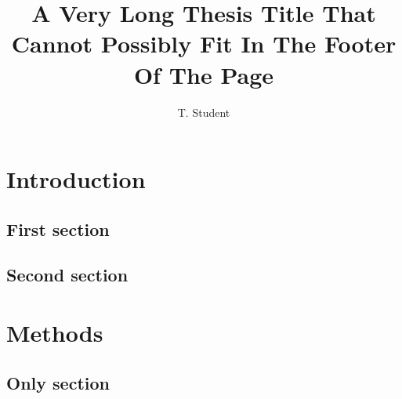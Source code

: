 \documentclass[phd,12pt,a4paper]{bangorthesis}
\title{A Very Long Thesis Title That Cannot Possibly Fit In The Footer Of The Page}
\author{T. Student}
\begin{document}
\maketitle
\chapter{Introduction}
\section{First section}
\section{Second section}
\chapter{Methods}
\section{Only section}
\end{document}
